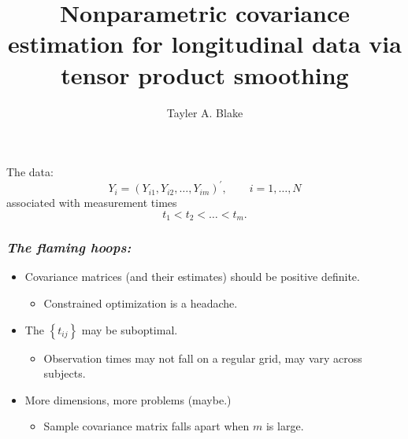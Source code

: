 \documentclass[12pt]{beamer}
\title{Nonparametric covariance estimation for longitudinal data via tensor product smoothing}
\author[The Ohio State University]{Tayler A. Blake}
\newcommand{\bi}{\begin{itemize}}
\newcommand{\ei}{\end{itemize}}
\newcommand{\newthought}[1]{{\small \color{hilight} {#1}}}
\begin{document}
{
\frame{
  \titlepage
}
}

\begin{frame}
\frametitle{\emph{}}
\newthought{The data:}
\begin{equation*}
Y_i = \left( Y_{i1}, Y_{i2}, \dots, Y_{im} \right)^\prime, \qquad i=1,\dots, N
\end{equation*}
\noindent
associated with measurement times 
\[
t_{1} < t_{2} < \dots< t_{m}.
\]
\end{frame}



\begin{frame}
\frametitle{\emph{The flaming hoops:}}
\bi
\item Covariance matrices (and their estimates) should be positive definite.
	\begin{itemize}
	\item Constrained optimization is a headache.
	\end{itemize} \pause
\item The $\left\{t_{ij} \right\}$ may be suboptimal. 
\begin{itemize}
	\item Observation times may not fall on a regular grid, may vary across subjects.
	\end{itemize} \pause
\item More dimensions, more problems (maybe.)
\begin{itemize}
	\item Sample covariance matrix falls apart when $m$ is large.
	\end{itemize} 
\ei
\end{frame}




\end{document}
